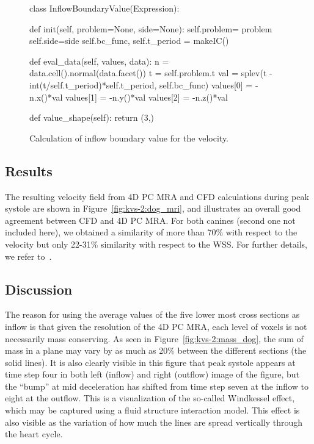 \begin{figure}
  \begin{center}
    \begin{python}
class InflowBoundaryValue(Expression):

    def init(self, problem=None, side=None):
        self.problem= problem
        self.side=side
        self.bc_func, self.t_period = makeIC()

    def eval_data(self, values, data):
        n = data.cell().normal(data.facet())
        t = self.problem.t
        val =  splev(t - int(t/self.t_period)*self.t_period, self.bc_func)
        values[0] = -n.x()*val
        values[1] = -n.y()*val
        values[2] = -n.z()*val

    def value_shape(self):
        return (3,)
    \end{python}
    \caption{Calculation of inflow boundary value for the velocity.}
    \label{fig:kvs-2:inflow_codeII}
  \end{center}
\end{figure}

\subsection{Results}

The resulting velocity field from 4D PC MRA and CFD calculations
during peak systole are shown in Figure~\ref{fig:kvs-2:dog_mri}, and
illustrates an overall good agreement between CFD and 4D PC MRA. For
both canines (second one not included here), we obtained a similarity
of more than 70\% with respect to the velocity but only 22-31\%
similarity with respect to the WSS. For further details, we refer
to~\citet{JiangJohnsonValen-SendstadEtAl2010}.

\subsection{Discussion}

The reason for using the average values of the five lower most cross
sections as inflow is that given the resolution of the 4D PC MRA, each
level of voxels is not necessarily mass conserving. As seen in
Figure~\ref{fig:kvs-2:mass_dog}, the sum of mass in a plane may vary by as
much as 20\% between the different sections (the solid lines).  It is also clearly
visible in this figure that peak systole appears at time step four in
both left (inflow) and right (outflow) image of the figure, but the
``bump'' at mid deceleration has shifted from time step seven at the
inflow to eight at the outflow.  This is a visualization of the
so-called Windkessel effect, which may be captured using a fluid
structure interaction model. This effect is also visible as the
variation of how much the lines are spread vertically through the
heart cycle.


